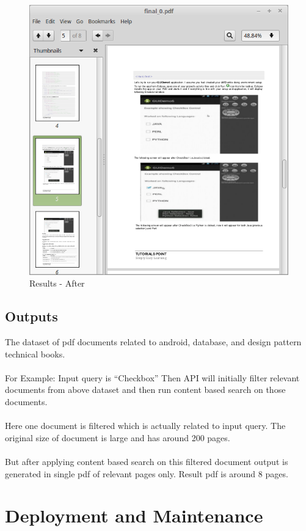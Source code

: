 \documentclass[oneside,a4paper,12pt]{report}
\begin{document}
{\begin{figure}[H]
\includegraphics{results-after}
\caption{Results - After}
\end{figure}

\section{Outputs}
The dataset of pdf documents related to android, database, and design pattern technical books.\\\\
For Example: Input query is “Checkbox”
Then API will initially filter relevant documents from above dataset and then run content based search on those documents.\\\\
Here one document is filtered which is actually related to input query. The original size of document is large and has around 200 pages. \\\\
But after applying content based search on this filtered document output is generated in single pdf of relevant pages only. Result pdf is around 8 pages.


\chapter{Deployment and Maintenance}

}
\end{document}
